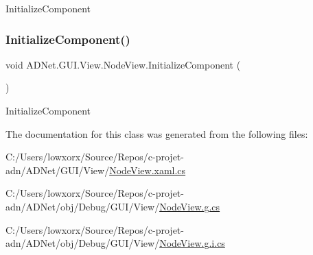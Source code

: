 Initialize\+Component 

\mbox{\label{class_a_d_net_1_1_g_u_i_1_1_view_1_1_node_view_a576ac61fb061727205551e77243e61e6}} 
\subsubsection{\texorpdfstring{Initialize\+Component()}{InitializeComponent()}\hspace{0.1cm}{\footnotesize\ttfamily [2/2]}}
{\footnotesize\ttfamily void A\+D\+Net.\+G\+U\+I.\+View.\+Node\+View.\+Initialize\+Component (\begin{DoxyParamCaption}{ }\end{DoxyParamCaption})}



Initialize\+Component 



The documentation for this class was generated from the following files\+:\begin{DoxyCompactItemize}
\item 
C\+:/\+Users/lowxorx/\+Source/\+Repos/c-\/projet-\/adn/\+A\+D\+Net/\+G\+U\+I/\+View/\hyperlink{_node_view_8xaml_8cs}{Node\+View.\+xaml.\+cs}\item 
C\+:/\+Users/lowxorx/\+Source/\+Repos/c-\/projet-\/adn/\+A\+D\+Net/obj/\+Debug/\+G\+U\+I/\+View/\hyperlink{_node_view_8g_8cs}{Node\+View.\+g.\+cs}\item 
C\+:/\+Users/lowxorx/\+Source/\+Repos/c-\/projet-\/adn/\+A\+D\+Net/obj/\+Debug/\+G\+U\+I/\+View/\hyperlink{_node_view_8g_8i_8cs}{Node\+View.\+g.\+i.\+cs}\end{DoxyCompactItemize}
